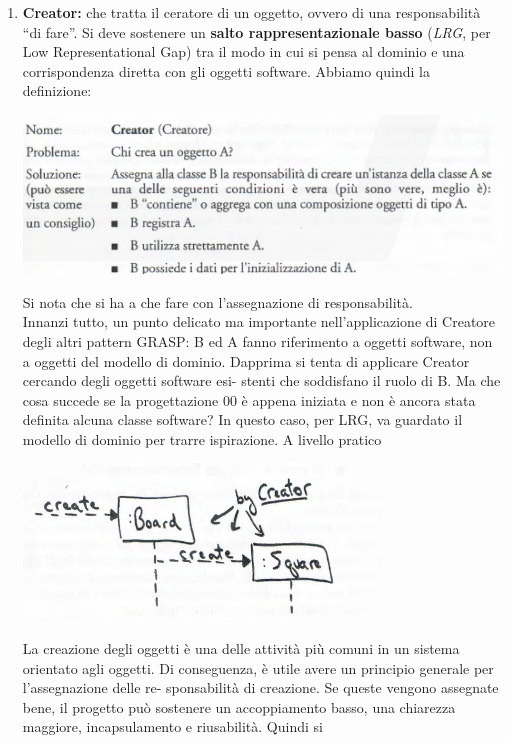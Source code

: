 \documentclass[a4paper,12pt, oneside]{book}
\begin{document}
\begin{enumerate}
\item \textbf{Creator:} che tratta il ceratore di un oggetto, ovvero di una responsabilità
  ``di fare''. Si deve sostenere un
\textbf{salto rappresentazionale basso} (\textit{LRG}, per Low Representational Gap) tra il modo in
cui si pensa al dominio e una corrispondenza diretta con gli oggetti software. Abbiamo quindi la definizione:
\begin{center}
\includegraphics[scale = 0.7]{img/grasp4.png}
\end{center}
Si nota che si ha a che fare con l'assegnazione di responsabilità.\\
Innanzi tutto, un punto delicato ma importante nell'applicazione di Creatore degli altri
pattern GRASP: B ed A fanno riferimento a oggetti software, non a oggetti del modello
di dominio. Dapprima si tenta di applicare Creator cercando degli oggetti software esi-
stenti che soddisfano il ruolo di B. Ma che cosa succede se la progettazione 00 è appena
iniziata e non è ancora stata definita alcuna classe software? In questo caso, per LRG, va
guardato il modello di dominio per trarre ispirazione. A livello pratico
\begin{center}
\includegraphics[scale = 0.7]{img/grasp6.png}
\end{center}
La creazione degli oggetti è una delle attività più comuni in un sistema orientato agli
oggetti. Di conseguenza, è utile avere un principio generale per l'assegnazione delle re-
sponsabilità di creazione. Se queste vengono assegnate bene, il progetto può sostenere un
accoppiamento basso, una chiarezza maggiore, incapsulamento e riusabilità. Quindi si

\end{enumerate}
\end{document}
